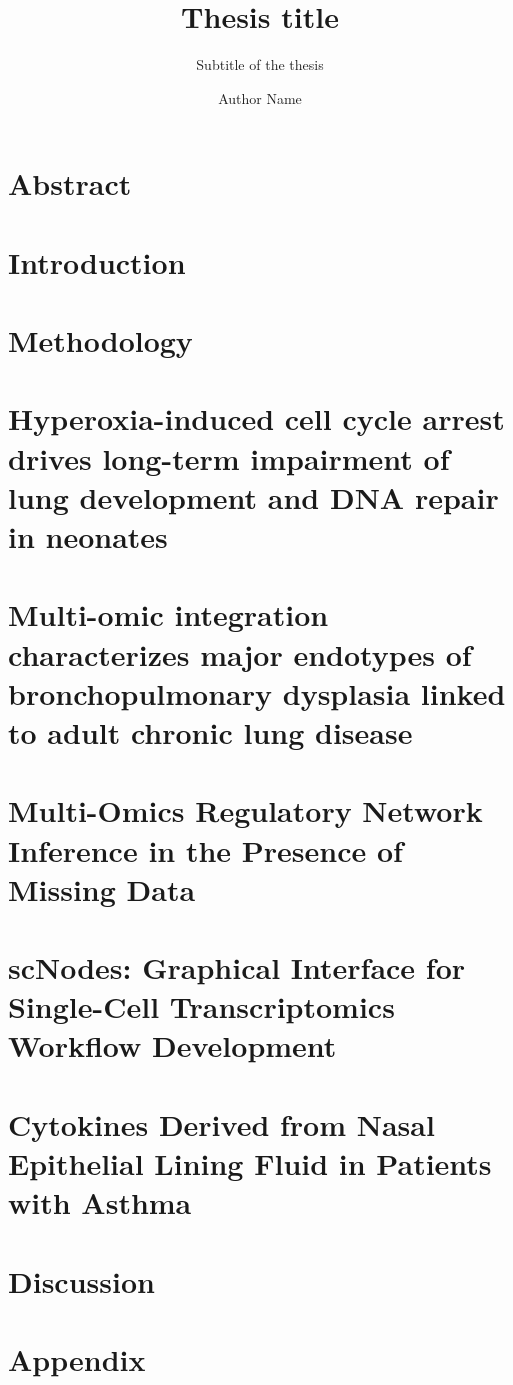 \documentclass[
  a4paper,            %
  thesis=phd,         %
  english,            %
]{tumbook}
\title{Thesis title}
\subtitle{Subtitle of the thesis}
\author{Author Name}
\begin{document}
\frontmatter
\maketitle
\chapter{Abstract}

\tableofcontents

\mainmatter
\chapter{Introduction}


\chapter{Methodology}


\chapter{Hyperoxia-induced cell cycle arrest drives long-term impairment of lung development and DNA repair in neonates}


\chapter{Multi-omic integration characterizes major endotypes of bronchopulmonary dysplasia linked to adult chronic lung disease}


\chapter{Multi-Omics Regulatory Network Inference in the Presence of Missing Data}


\chapter{scNodes: Graphical Interface for Single-Cell Transcriptomics Workflow Development}


\chapter{Cytokines Derived from Nasal Epithelial Lining Fluid in Patients with Asthma}


\chapter{Discussion}


\appendix
\chapter{Appendix}
\lipsum[4]

% 
\end{document}
